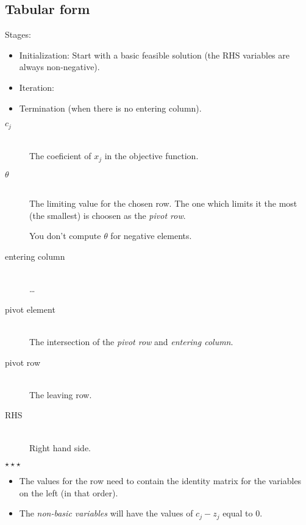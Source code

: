 \documentclass[a4paper, 12pt]{article}
\newcommand*\sepstars{%
  \begin{center}
    $\star\star\star$
  \end{center}
}
\begin{document}
\subsection{Tabular form}

Stages:

\begin{itemize}
    \item Initialization: Start with a basic feasible solution (the RHS
    variables are always non-negative).
    
    \item Iteration:
    
    \item Termination (when there is no entering column).
\end{itemize}

\begin{description}

\item[$c_j$] \hfill \\
    The coeficient of $x_j$ in the objective function.
    
\item[$\theta$] \hfill \\
    The limiting value for the chosen row. The one which limits it the most (the
    smallest) is choosen as the \emph{pivot row}.
    
    You don't compute $\theta$ for negative elements.
    
\item[entering column] \hfill \\
    \ldots
    
\item[pivot element] \hfill \\
    The intersection of the \emph{pivot row} and \emph{entering column}.
    
\item[pivot row] \hfill \\
    The leaving row.

\item[RHS] \hfill \\
    Right hand side.

\end{description}

\sepstars

\begin{itemize}
    \item The values for the row need to contain the identity matrix for the
    variables on the left (in that order).

    \item The \emph{non-basic variables} will have the values of $c_j - z_j$
    equal to 0.
\end{itemize}
\end{document}
